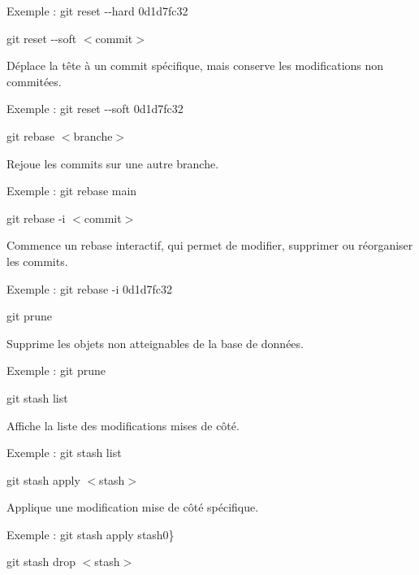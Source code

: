 \begin{DoxyEnumerate}
\begin{DoxyItemize}
\item Exemple \+: {\ttfamily git reset -\/-\/hard 0d1d7fc32}
\end{DoxyItemize}
\item {\ttfamily git reset -\/-\/soft $<$commit$>$}
\begin{DoxyItemize}
\item Déplace la tête à un commit spécifique, mais conserve les modifications non commitées.
\item Exemple \+: {\ttfamily git reset -\/-\/soft 0d1d7fc32}
\end{DoxyItemize}
\item {\ttfamily git rebase $<$branche$>$}
\begin{DoxyItemize}
\item Rejoue les commits sur une autre branche.
\item Exemple \+: {\ttfamily git rebase main}
\end{DoxyItemize}
\item {\ttfamily git rebase -\/i $<$commit$>$}
\begin{DoxyItemize}
\item Commence un rebase interactif, qui permet de modifier, supprimer ou réorganiser les commits.
\item Exemple \+: {\ttfamily git rebase -\/i 0d1d7fc32}
\end{DoxyItemize}
\item {\ttfamily git prune}
\begin{DoxyItemize}
\item Supprime les objets non atteignables de la base de données.
\item Exemple \+: {\ttfamily git prune}
\end{DoxyItemize}
\item {\ttfamily git stash list}
\begin{DoxyItemize}
\item Affiche la liste des modifications mises de côté.
\item Exemple \+: {\ttfamily git stash list}
\end{DoxyItemize}
\item {\ttfamily git stash apply $<$stash$>$}
\begin{DoxyItemize}
\item Applique une modification mise de côté spécifique.
\item Exemple \+: {\ttfamily git stash apply stash0\}}
\end{DoxyItemize}
\item {\ttfamily git stash drop $<$stash$>$}

\end{DoxyEnumerate}

